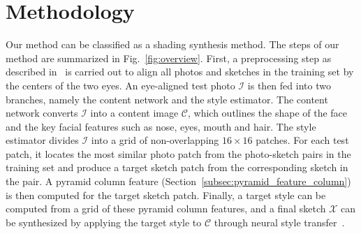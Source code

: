 \documentclass[10pt,twocolumn,letterpaper]{article}
\begin{document}
\section{Methodology}
Our method can be classified as a shading synthesis method. The steps of our method are summarized in Fig.~\ref{fig:overview}. First, a preprocessing step as described in~\cite{wang2009face} is carried out to align all photos and sketches in the training set by the centers of the two eyes. An eye-aligned test photo $\mathcal{I}$ is then fed into two branches, namely the content network and the style estimator. The content network converts $\mathcal{I}$ into a content image $\mathcal{C}$, which outlines the shape of the face and the key facial features such as nose, eyes, mouth and hair. The style estimator divides $\mathcal{I}$ into a grid of non-overlapping $16\times16$ patches. For each test patch, it locates the most similar photo patch from the photo-sketch pairs in the training set and produce a target sketch patch from the corresponding sketch in the pair. A pyramid column feature (Section~\ref{subsec:pyramid_feature_column}) is then computed for the target sketch patch. Finally, a target style can be computed from a grid of these pyramid column features, and a final sketch $\mathcal{X}$ can be synthesized by applying the target style to $\mathcal{C}$ through neural style transfer~\cite{gatys2015neural}. 

\end{document}
